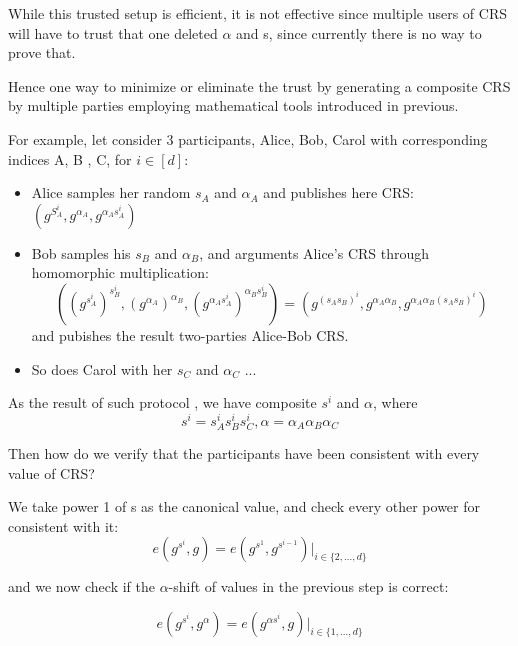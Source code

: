 \documentclass[a4paper,11pt]{article}
\begin{document}
While this trusted setup is efficient, it is not effective since multiple users of CRS will have to trust that one deleted $\alpha$ and s, since currently there is no way to prove that.

Hence one way to minimize or eliminate the trust by generating a composite CRS by multiple parties employing mathematical tools introduced in previous.

For example, let consider 3 participants, Alice, Bob, Carol with corresponding indices A, B , C, for $i \in [d]$:

\begin{itemize}
\item Alice samples her random $s_A$ and $\alpha_A$ and publishes here CRS:  $(g^{S_A^i}, g^{\alpha_A}, g^{\alpha_A s_A^i})$
\item Bob samples his $s_B$ and $\alpha_B$, and arguments Alice's CRS through homomorphic multiplication:
\begin{displaymath}
((g^{s_A^i})^{s_B^i}, (g^{\alpha_A})^{\alpha_B}, (g^{\alpha_A s_A^i})^{\alpha_B s_B^i} )  = (g^{(s_A s_B)^i}, g^{\alpha_A \alpha_B}, g^{\alpha_A \alpha_B (s_A s_B)^i})
\end{displaymath}
and pubishes the result two-parties Alice-Bob CRS. 
\item So does Carol with her $s_C$ and $\alpha_C$ ...
\end{itemize}

As the result of such protocol , we have composite $s^i$ and $\alpha$, where 
\begin{equation}
s^i = s_A^i s_B^i s_C^i,  \alpha = \alpha_A \alpha_B \alpha_C
\end{equation}

Then how do we verify that the participants have been consistent with every value of CRS? 

We take power 1 of s as the canonical value, and check every other power for consistent with it:
\begin{displaymath}
e(g^{s^i}, g) = e(g^{s^1}, g^{s^{i-1}}) |_{i \in \{2, ..., d\}}
\end{displaymath}

and we now check if the $\alpha$-shift of values in the previous step is correct:

\begin{displaymath}
e(g^{s^i}, g^{\alpha}) = e(g^{\alpha{s^i}}, g) |_{i \in \{1, ..., d\}}
\end{displaymath}
\end{document}
